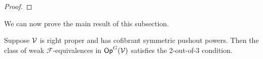 \documentclass[a4paper,10pt
,draft
]{article}%
\renewcommand{\F}{\mathcal F}
\renewcommand{\1}{\eta}%
\begin{document}
\begin{proof}
\end{proof}

We can now prove the main result of this subsection.
 
\begin{proposition}
      \label{CAV_4.15_PROP}
      \label{2OUTOF3_PROP}
      Suppose $\mathcal V$ is right proper and has cofibrant symmetric pushout powers.
      Then the class of weak $\F$-equivalences in $\mathsf{Op}^G(\mathcal V)$ satisfies the 2-out-of-3 condition.
\end{proposition}
\end{document}
